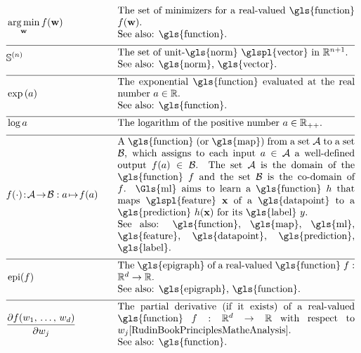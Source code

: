 \newpage
\begin{align}
    	&\aargmin_{\weights} f(\weights) &\quad &\parbox{.70\textwidth}{The set of minimizers for a real-valued \gls{function} $f(\weights)$. 
    		\\ See also: \gls{function}. } \nonumber \\[2mm] \hline \nonumber\\[-5mm]
    	&\sphere{\nrnodes} &\quad &\parbox{.70\textwidth}{The set of unit-\gls{norm} \glspl{vector} in $\mathbb{R}^{\nrnodes+1}$.
    		\\ See also: \gls{norm}, \gls{vector}. }\nonumber \\[2mm] \hline \nonumber\\[-5mm]
	&\exp\,(a) &\quad &\parbox{.70\textwidth}{The exponential \gls{function} evaluated at the real number $a \in \mathbb{R}$.
		\\ See also: \gls{function}. } \nonumber \\[2mm] \hline \nonumber\\[-5mm]
	&\log a &\quad &\mbox{The logarithm of the positive number $a \in \mathbb{R}_{++}$.  } \nonumber \\[2mm] \hline \nonumber\\[-5mm]
	&f(\cdot)\!:\!\mathcal{A}\!\rightarrow\!\mathcal{B} :  a \!\mapsto\!f(a) &\quad &\parbox{.70\textwidth}{
	 	A \gls{function} (or \gls{map}) from a set $\mathcal{A}$ to a set $\mathcal{B}$, which assigns to each input 
	 	$a \in \mathcal{A}$ a well-defined output $f(a) \in \mathcal{B}$.
	 	The set $\mathcal{A}$ is the domain of the \gls{function} $f$ and the set $\mathcal{B}$ is the 
	 	co-domain of $f$. \Gls{ml} aims to learn a \gls{function} $\hypothesis$ that maps \glspl{feature} 
	 	$\featurevec$ of a \gls{datapoint} to a \gls{prediction} $\hypothesis(\featurevec)$ for its \gls{label} $\truelabel$.
		\\ See also: \gls{function}, \gls{map}, \gls{ml}, \gls{feature}, \gls{datapoint}, \gls{prediction}, \gls{label}.} \nonumber \\[2mm] \hline \nonumber\\[-5mm]
	&\operatorname{epi}(f)  & \quad & \parbox{.70\textwidth}{The \gls{epigraph} of a real-valued \gls{function} 
	 	$f: \mathbb{R}^{\featuredim}\rightarrow \mathbb{R}$.
		\\ See also: \gls{epigraph}, \gls{function}. } \nonumber \\[2mm]  \hline \nonumber\\[-5mm]
	&  \frac{\partial f(\weight_{1}, \,\ldots, \,\weight_{\nrfeatures})}{\partial \weight_{\featureidx}} & \quad & \parbox{.70\textwidth}{The partial derivative 
		(if it exists) of a real-valued \gls{function} $f: \mathbb{R}^{\featuredim}\rightarrow \mathbb{R}$ with respect 
		to\ $\weight_{\featureidx}$\cite[Ch. 9]{RudinBookPrinciplesMatheAnalysis}.
		\\ See also: \gls{function}. } \nonumber 
\end{align} 

